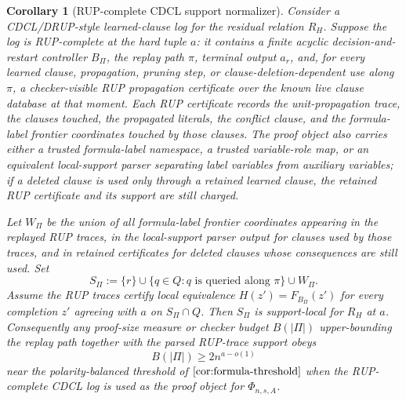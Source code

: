 \documentclass[11pt]{article}
\newtheorem{corollary}[theorem]{Corollary}
\theoremstyle{definition}
\begin{document}
\begin{corollary}[RUP-complete CDCL support normalizer]\label{cor:rup-complete-cdcl}
Consider a CDCL/DRUP-style learned-clause log for the residual relation \(R_H\).  Suppose the log is RUP-complete at the hard tuple \(a\): it contains a finite acyclic decision-and-restart controller \(B_\Pi\), the replay path \(\pi\), terminal output \(a_r\), and, for every learned clause, propagation, pruning step, or clause-deletion-dependent use along \(\pi\), a checker-visible RUP propagation certificate over the known live clause database at that moment.  Each RUP certificate records the unit-propagation trace, the clauses touched, the propagated literals, the conflict clause, and the formula-label frontier coordinates touched by those clauses.  The proof object also carries either a trusted formula-label namespace, a trusted variable-role map, or an equivalent local-support parser separating label variables from auxiliary variables; if a deleted clause is used only through a retained learned clause, the retained RUP certificate and its support are still charged.

Let \(W_\Pi\) be the union of all formula-label frontier coordinates appearing in the replayed RUP traces, in the local-support parser output for clauses used by those traces, and in retained certificates for deleted clauses whose consequences are still used.  Set
\[
  S_\Pi:=\{r\}\cup\{q\in Q:q\text{ is queried along }\pi\}\cup W_\Pi .
\]
Assume the RUP traces certify local equivalence \(H(z')=F_{B_\Pi}(z')\) for every completion \(z'\) agreeing with \(a\) on \(S_\Pi\cap Q\).  Then \(S_\Pi\) is support-local for \(R_H\) at \(a\).  Consequently any proof-size measure or checker budget \(B(|\Pi|)\) upper-bounding the replay path together with the parsed RUP-trace support obeys
\[
  B(|\Pi|)\ge 2n^{a-o(1)}
\]
near the polarity-balanced threshold of \(\Cref{cor:formula-threshold}\) when the RUP-complete CDCL log is used as the proof object for \(\Phi_{n,s,A}\).
\end{corollary}
\end{document}
